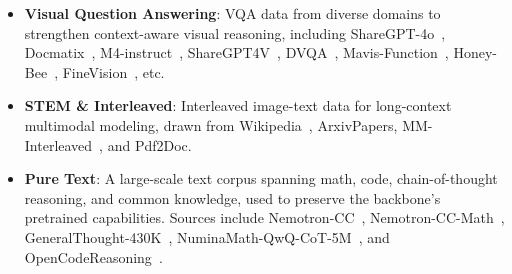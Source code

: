 \documentclass[11pt, a4paper, logo, copyright]{googledeepmind}
\begin{document}
\begin{itemize}
    \item \textbf{Visual Question Answering}: VQA data from diverse domains to strengthen context-aware visual reasoning, including ShareGPT-4o~\citep{cui2025comprehensive}, Docmatix~\citep{laurencon2024building}, M4-instruct~\citep{li2024llavanext-interleave}, ShareGPT4V~\citep{chen2024sharegpt4v}, DVQA~\citep{kafle2018dvqa}, Mavis-Function~\citep{zhang2024mavis}, Honey-Bee~\citep{bansal2025honeybee}, FineVision~\citep{wiedmann2025finevision}, etc.
    \item \textbf{STEM \& Interleaved}: Interleaved image-text data for long-context multimodal modeling, drawn from Wikipedia~\citep{wikidump}, ArxivPapers, MM-Interleaved~\citep{tian2024mm}, and Pdf2Doc.
    \item \textbf{Pure Text}: A large-scale text corpus spanning math, code, chain-of-thought reasoning, and common knowledge, used to preserve the backbone's pretrained capabilities. Sources include Nemotron-CC~\citep{nvidia_nemotron_nano_v3_2025}, Nemotron-CC-Math~\citep{karimi2025nemotroncc,nvidia2025nvidianemotronnano2}, GeneralThought-430K~\citep{RJT1990_2025GeneralThoughtArchive}, NuminaMath-QwQ-CoT-5M~\citep{primeintellect2024numinamath}, and OpenCodeReasoning~\citep{ahmad2025opencodereasoning}.

\end{itemize}
\end{document}
